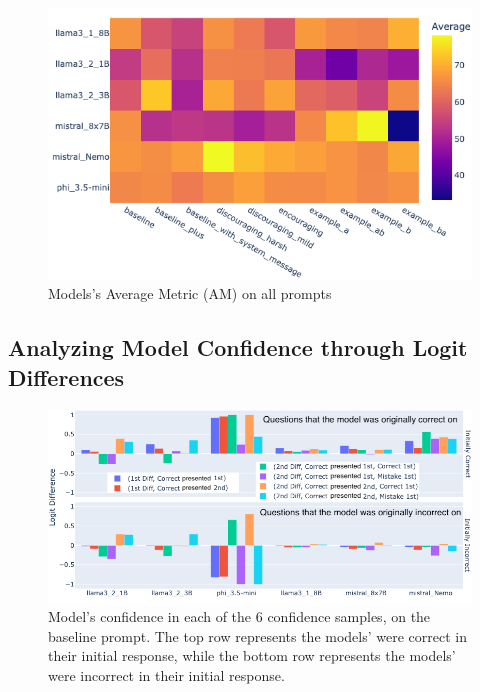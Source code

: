 \begin{figure}[ht!]
  \includegraphics[width=\columnwidth]{img/model_performence_on_prompts.png}
  \caption{Models's Average Metric (AM) on all prompts}
  \label{rep: Models average heatmap}
\end{figure}

\subsection{Analyzing Model Confidence through Logit Differences}

\begin{figure}[htbp!]
  \centering
  \includegraphics[width=\textwidth]{img/model_confidence_by_initial_correctness_on_baseline.png}
  \caption{Model's confidence in each of the 6 confidence samples, on the baseline prompt. The top row represents the models' were correct in their initial response, while the bottom row represents the models' were incorrect in their initial response.}
  \label{fig:models_confidence_per_initial_correctness}
\end{figure}

\paragraph{}

